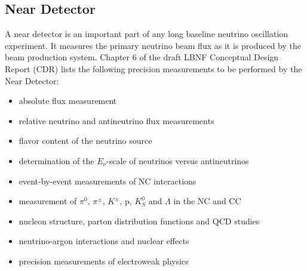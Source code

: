 \subsection{Near Detector}


A near detector is an important part of any long baseline neutrino oscillation experiment. It measures the primary neutrino beam flux as it is produced by the beam production system. Chapter 6 of the draft LBNF Conceptual Design Report (CDR) \cite{ref_LBNFdoc_volume-detectors} lists the following precision measurements to be performed by the Near Detector: 
\begin{itemize}
  \item absolute flux measurement
  \item relative neutrino and antineutrino flux measurements
  \item flavor content of the neutrino source
  \item determination of the $E_\nu$-scale of neutrinos versus antineutrinos
  \item event-by-event measurements of NC interactions
  \item measurement of $\pi^0$, $\pi^\pm$, $K^\pm$, p, $K^0_S$ and $\Lambda$ in the NC and CC
  \item nucleon structure, parton distribution functions and QCD studies
  \item neutrino-argon interactions and nuclear effects
  \item precision measurements of electroweak physics
\end{itemize}

